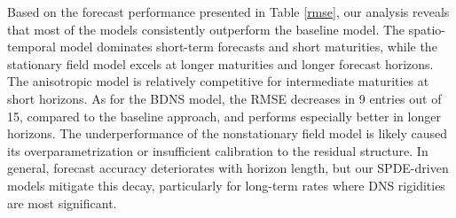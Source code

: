 \documentclass[
  12pt]{article}
\begin{document}
Based on the forecast performance presented in Table \ref{rmse}, our analysis reveals that most of the models consistently outperform the baseline model. The spatio-temporal model dominates short-term forecasts and short maturities, while the stationary field model excels at longer maturities and longer forecast horizons. The anisotropic model is relatively competitive for intermediate maturities at short horizons. As for the BDNS model, the RMSE decreases in 9 entries out of 15, compared to the baseline approach, and performs especially better in longer horizons. The underperformance of the nonstationary field model is likely caused its overparametrization or insufficient calibration to the residual structure. In general, forecast accuracy deteriorates with horizon length, but our SPDE-driven models mitigate this decay, particularly for long-term rates where DNS rigidities are most significant.
\end{document}
